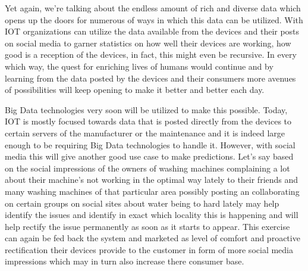 \documentclass[sigconf]{acmart}
\begin{document}
Yet again, we're talking about the endless amount of rich and diverse data which opens up the doors for numerous of ways in which this data can be utilized. With IOT organizations can utilize the data available from the devices and their posts on social media to garner statistics on how well their devices are working, how good is a reception of the devices, in fact, this might even be recursive. In every which way, the quest for enriching lives of humans would continue and by learning from the data posted by the devices and their consumers more avenues of possibilities will keep opening to make it better and better each day.

Big Data technologies very soon will be utilized to make this possible. Today, IOT is mostly focused towards data that is posted directly from the devices to certain servers of the manufacturer or the maintenance and it is indeed large enough to be requiring Big Data technologies to handle it. However, with social media this will give another good use case to make predictions. Let's say based on the social impressions of the owners of washing machines complaining a lot about their machine's not working in the optimal way lately to their friends and many washing machines of that particular area possibly posting an collaborating on certain groups on social sites about water being to hard lately may help identify the issues and identify in exact which locality this is happening and will help rectify the issue permanently as soon as it starts to appear. This exercise can again be fed back the system and marketed as level of comfort and proactive rectification their devices provide to the customer in form of more social media impressions which may in turn also increase there consumer base.
\end{document}
